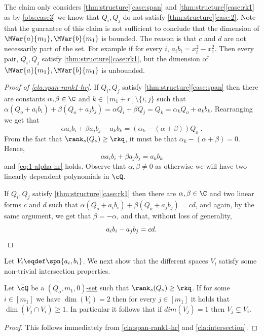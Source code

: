 The claim only considers \autoref{thm:structure}\ref{case:span} and \autoref{thm:structure}\ref{case:rk1} as by \autoref{obs:case3} we know that $Q_i,Q_j$ do not satisfy \autoref{thm:structure}\ref{case:2}.
 Note that the guarantee of this claim is not sufficient to conclude that the dimension of $\MVar{a}{m_1}, \MVar{b}{m_1}$ is bounded. The reason is that $ c$ and $d $ are not necessarily part of the set. For example if for every $i$, $a_ib_i = x_i^2 - x_1^2$. Then every pair, $Q_i, Q_j$ satisfy \autoref{thm:structure}\ref{case:rk1}, but the dimension of $\MVar{a}{m_1}, \MVar{b}{m_1}$ is unbounded.

\begin{proof}[Proof of \autoref{cla:span-rank1-hr}]
If $Q_i,Q_j$ satisfy \autoref{thm:structure}\ref{case:span} then there are constants  $\alpha, \beta \in \C$ and $k \in [m_1+r]\setminus \{i,j\}$ such that $\alpha (Q_o+a_ib_i) + \beta ( Q_o+a_jb_j) = \alpha Q_i+\beta Q_j = Q_k = \alpha_k Q_o+a_kb_k$. Rearranging we get that \[\alpha a_ib_i + \beta a_jb_j -a_kb_k = (\alpha_k-(\alpha+\beta))Q_o\;.\] From the fact that $\rank_s(Q_o) \geq \rkq$, it must be that $\alpha_k-(\alpha+\beta) = 0$. Hence,
\begin{equation} \label{eq:span-ak-hr}
 \alpha a_ib_i + \beta a_jb_j = a_kb_k
\end{equation}
and \eqref{eq:1-alpha-hr} holds. Observe that $\alpha, \beta \neq 0$ as otherwise we will have two linearly dependent polynomials in $\cQ$.

If $Q_i,Q_j$ satisfy \autoref{thm:structure}\ref{case:rk1} then there are $\alpha, \beta \in \C$ and two linear forms $c$ and $d$ such that $ \alpha (Q_o+a_ib_i) + \beta ( Q_o+a_jb_j) = cd$, and again, by the same argument, we get that  $\beta = -\alpha$, and that, without loss of generality,
\begin{equation*}
  a_ib_i -a_jb_j = cd. \qedhere
\end{equation*}
\end{proof}

Let $V_i \eqdef \spn{a_i,b_i}$. We next show that the different spaces $V_i$ satisfy some non-trivial intersection properties.

\begin{claim}\label{cla:V_i intersection-hr}
Let $\tilde{\cQ}$ be a \hyperref[def:Q-dom]{$(Q_o,m_1,0)$-set} such that $\rank_s(Q_o)\geq \rkq$. If for some $i\in [m_1]$ we have $\dim(V_i)=2$ then for every $j \in [m_1]$ it holds that  $\dim(V_j\cap V_i) \geq 1$. In particular it follows that if $dim(V_j)=1$ then $V_j\varsubsetneq V_i$.
\end{claim}
\begin{proof}

This follows immediately from \autoref{cla:span-rank1-hr} and \autoref{cla:intersection}. 

\end{proof}




